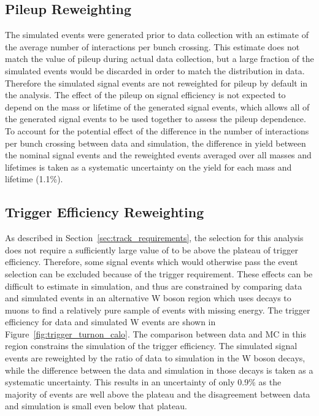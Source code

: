 \subsection{Pileup Reweighting}
The simulated events were generated prior to data collection with an estimate of the average number of interactions per bunch crossing.
This estimate does not match the value of pileup during actual data collection, but a large fraction of the simulated events would be discarded in order to match the distribution in data.
Therefore the simulated signal events are not reweighted for pileup by default in the analysis.
The effect of the pileup on signal efficiency is not expected to depend on the mass or lifetime of the generated signal events, which allows all of the generated signal events to be used together to assess the pileup dependence.
To account for the potential effect of the difference in the number of interactions per bunch crossing between data and simulation, the difference in yield between the nominal signal events and the reweighted events averaged over all masses and lifetimes is taken as a systematic uncertainty on the yield for each mass and lifetime (1.1\%).

\subsection{Trigger Efficiency Reweighting}
As described in Section~\ref{sec:track_requirements}, the selection for this analysis does not require a sufficiently large value of \met to be above the plateau of trigger efficiency.
Therefore, some signal events which would otherwise pass the event selection can be excluded because of the trigger requirement.
These effects can be difficult to estimate in simulation, and thus are constrained by comparing data and simulated events in an alternative W boson region which uses decays to muons to find a relatively pure sample of events with missing energy.
The trigger efficiency for data and simulated W events are shown in Figure~\ref{fig:trigger_turnon_calo}.
The comparison between data and MC in this region constrains the simulation of the trigger efficiency.
The simulated signal events are reweighted by the ratio of data to simulation in the W boson decays, while the difference between the data and simulation in those decays is taken as a systematic uncertainty.
This results in an uncertainty of only 0.9\% as the majority of events are well above the plateau and the disagreement between data and simulation is small even below that plateau.

